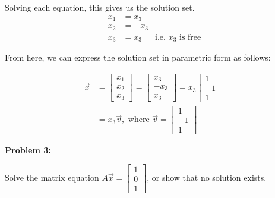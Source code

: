 \documentclass[10pt,letterpaper,final]{report}
\begin{document}
Solving each equation, this gives us the solution set.
\begin{align*}
  x_1 & = x_3                               \\
  x_2 & = - x_3                             \\
  x_3 & = x_3   & \text{i.e. $x_3$ is free}
\end{align*}

From here, we can express the solution set in parametric form as follows:

\begin{align*}
  \vec{x} & = \begin{bmatrix}
                x_1 \\
                x_2 \\
                x_3
              \end{bmatrix} = \begin{bmatrix}
                                x_3   \\
                                - x_3 \\
                                x_3
                              \end{bmatrix} = x_3\begin{bmatrix}
                                                   1  \\
                                                   -1 \\
                                                   1
                                                 \end{bmatrix}  \\[1ex]
          & = x_3\vec{v}, \text{ where }\vec{v} = \begin{bmatrix}
                                                    1  \\
                                                    -1 \\
                                                    1
                                                  \end{bmatrix}
\end{align*}

\pagebreak

\noindent\textbf{Problem 3:}
\medskip

Solve the matrix equation $A\vec{x} = \begin{bmatrix}1 \\0 \\1\end{bmatrix}$, or show that no solution exists.
\end{document}
